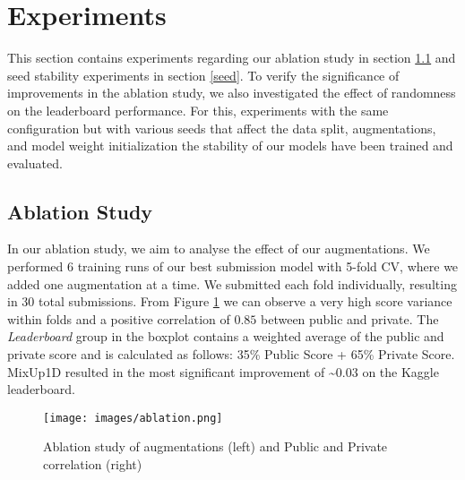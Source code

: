 \documentclass[
]{ceurart}
\begin{document}


\section {Experiments} \label{results}

This section contains experiments regarding our ablation study in section \ref{abl} and seed stability experiments in section \ref{seed}. To verify the significance of improvements in the ablation study, we also investigated the effect of randomness on the leaderboard performance. For this, experiments with the same configuration but with various seeds that affect the data split, augmentations, and model weight initialization the stability of our models have been trained and evaluated. 



\subsection{Ablation Study} \label{abl}
In our ablation study, we aim to analyse the effect of our augmentations. We performed 6 training runs of our best submission model with 5-fold CV, where we added one augmentation at a time. We submitted each fold individually, resulting in 30 total submissions. From Figure \ref{fig:ablstudy} we can observe a very high score variance within folds and a positive correlation of $0.85$ between public and private. The \textit{Leaderboard} group in the boxplot contains a weighted average of the public and private score and is calculated as follows: 35\% Public Score + 65\% Private Score. MixUp1D resulted in the most significant improvement of \textasciitilde $0.03$ on the Kaggle leaderboard.

\begin{figure}[h!]
    \centering
    \hspace*{-1cm}
    \texttt{[image: images/ablation.png]}
    \caption{Ablation study of augmentations (left) and Public and Private correlation (right)}
    \label{fig:ablstudy}
\end{figure}
\end{document}
